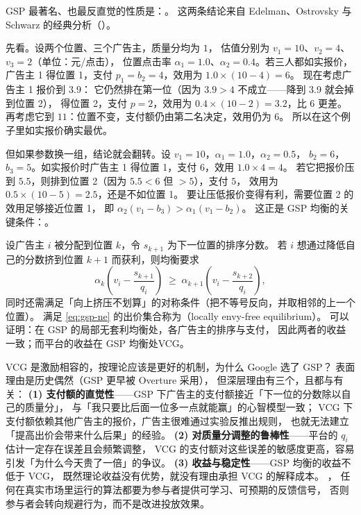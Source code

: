GSP 最著名、也最反直觉的性质是：。
这两条结论来自 Edelman、Ostrovsky 与 Schwarz 的经典分析（\cite{edelman2007gsp}）。

先看。设两个位置、三个广告主，质量分均为 $1$，
估值分别为 $v_1 = 10$、$v_2 = 4$、$v_3 = 2$（单位：元/点击），
位置点击率 $\alpha_1 = 1.0$、$\alpha_2 = 0.4$。若三人都如实报价，
广告主 1 得位置 1，支付 $p_1 = b_2 = 4$，效用为 $1.0 \times (10 - 4) = 6$。
现在考虑广告主 1 报价到 $3.9$：
它仍然排在第一位（因为 $3.9 > 4$ 不成立——降到 3.9 就会掉到位置 2），
得位置 2，支付 $p = 2$，效用为 $0.4 \times (10 - 2) = 3.2$，比 6 更差。
再考虑它到 $11$：位置不变，支付额仍由第二名决定，效用仍为 6。
所以在这个例子里如实报价确实最优。

但如果参数换一组，结论就会翻转。设 $v_1 = 10$，$\alpha_1 = 1.0$，$\alpha_2 = 0.5$，
$b_2 = 6$，$b_3 = 5$。如实报价时广告主 1 得位置 1，支付 6，效用 $1.0 \times 4 = 4$。
若它把报价压到 $5.5$，则排到位置 2（因为 $5.5 < 6$ 但 $> 5$），支付 $5$，
效用为 $0.5 \times (10 - 5) = 2.5$，还是不如位置 1。
要让压低报价变得有利，需要位置 2 的效用足够接近位置 1，
即 $\alpha_2 (v_1 - b_3) > \alpha_1 (v_1 - b_2)$。
这正是 GSP 均衡的关键条件：。

\begin{formulacard}
设广告主 $i$ 被分配到位置 $k$，令 $s_{k+1}$ 为下一位置的排序分数。
若 $i$ 想通过降低自己的分数挤到位置 $k+1$ 而获利，则均衡要求
\begin{equation}
\alpha_k \left( v_i - \frac{s_{k+1}}{q_i} \right)
\;\ge\;
\alpha_{k+1} \left( v_i - \frac{s_{k+2}}{q_i} \right) ,
\label{eq:gsp-ne}
\end{equation}
同时还需满足「向上挤压不划算」的对称条件（把不等号反向，并取相邻的上一个位置）。
满足 \cref{eq:gsp-ne} 的出价集合称为（locally envy-free equilibrium）。
可以证明：在 GSP 的局部无套利均衡处，各广告主的排序与支付，
因此两者的收益一致；而平台的收益在 GSP 均衡处VCG。
\end{formulacard}

\begin{insight}
VCG 是激励相容的，按理论应该是更好的机制，为什么 Google 选了 GSP？
表面理由是历史偶然（GSP 更早被 Overture 采用），
但深层理由有三个，且都与有关：
\textbf{(1) 支付额的直觉性}——GSP 下广告主的支付额接近「下一位的分数除以自己的质量分」，
与「我只要比后面一位多一点就能赢」的心智模型一致；
VCG 下支付额依赖其他广告主的报价，广告主很难通过实验反推出规则，
也就无法建立「提高出价会带来什么后果」的经验。
\textbf{(2) 对质量分调整的鲁棒性}——平台的 $q_i$ 估计一定存在误差且会频繁调整，
VCG 的支付额对这些误差的敏感度更高，容易引发「为什么今天贵了一倍」的争议。
\textbf{(3) 收益与稳定性}——GSP 均衡的收益不低于 VCG，
既然理论收益没有优势，就没有理由承担 VCG 的解释成本。
，
任何在真实市场里运行的算法都要为参与者提供可学习、可预期的反馈信号，
否则参与者会转向规避行为，而不是改进投放效果。
\end{insight}

